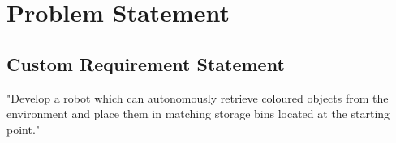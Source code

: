 \uomtoc


  



\begin{uomoriginality}
  \uomoriginalitydeclaration 
\end{uomoriginality}
\uomcopyrightstatement






\uomstartmainbody %



\section{Problem Statement} %
  
  \subsection{Custom Requirement Statement}
  "Develop a robot which can autonomously retrieve coloured objects from the environment and place them in matching storage bins located at the starting point." 

